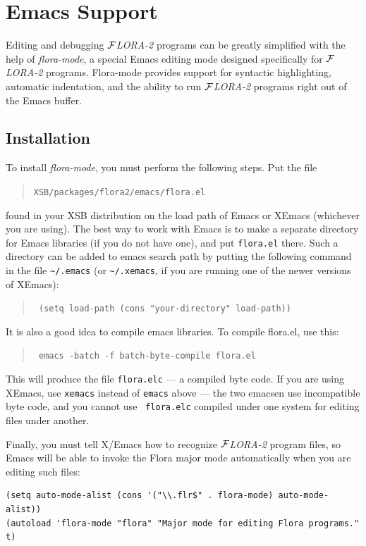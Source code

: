 \documentclass[11pt]{article}
\newcommand{\FLORA}{{\mbox{${\cal F}${\small\it LORA}\rm\emph{-2}}}\xspace}
\begin{document}
\section{Emacs Support}

Editing and debugging \FLORA programs can be greatly simplified with the
help of \emph{flora-mode}, a special Emacs editing mode designed
specifically for \FLORA programs. Flora-mode provides support for syntactic
highlighting, automatic indentation, and the ability to run \FLORA programs
right out of the Emacs buffer.


\subsection{Installation}


To install \emph{flora-mode}, you must perform the following steps. Put the
file
\begin{quote}
  {\tt XSB/packages/flora2/emacs/flora.el} 
\end{quote}
found in your XSB distribution on the load path of Emacs or XEmacs
(whichever you are using). The best way to work with Emacs is to make a
separate directory for Emacs libraries (if you do not have one), and put
{\tt flora.el} there. Such a directory can be added to emacs search path by
putting the following command in the file \verb|~/.emacs| (or
\verb|~/.xemacs|, if you are running one of the newer versions of XEmacs):
\begin{quote}
  \tt
   (setq load-path (cons "your-directory" load-path)) 
\end{quote}
It is also a good idea to compile emacs libraries. To compile flora.el,
use this:
\begin{quote}
  \tt
   emacs -batch -f batch-byte-compile flora.el 
\end{quote}
This will produce the file {\tt flora.elc} --- a compiled byte code.
If you are using XEmacs, use {\tt xemacs} instead of {\tt emacs} above ---
the two emacsen use incompatible byte code, and you cannot use {\tt
  flora.elc} compiled under one system for editing files under another.

Finally, you must tell X/Emacs how to recognize \FLORA program files, so
Emacs will be able to invoke the Flora major mode automatically when you
are editing such files:
\begin{verbatim}
(setq auto-mode-alist (cons '("\\.flr$" . flora-mode) auto-mode-alist))
(autoload 'flora-mode "flora" "Major mode for editing Flora programs." t)
\end{verbatim}
\end{document}
